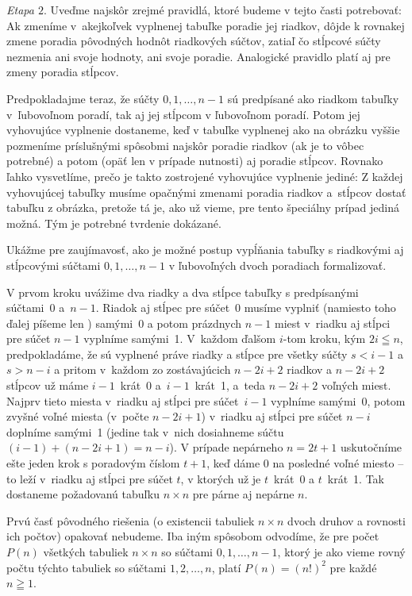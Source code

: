 {\emph{Etapa $2$}. Uveďme najskôr zrejmé pravidlá, ktoré budeme v tejto časti
potrebovať: Ak zmeníme v~akejkoľvek vyplnenej tabuľke
poradie jej riadkov,
dôjde k rovnakej zmene poradia pôvodných hodnôt riadkových súčtov,
zatiaľ čo stĺpcové súčty nezmenia ani svoje hodnoty, ani svoje
poradie. Analogické pravidlo platí aj pre zmeny poradia stĺpcov.

Predpokladajme teraz, že súčty $0,1,\dots,n-1$ sú predpísané
ako riadkom tabuľky v~ľubovoľnom poradí, tak aj jej stĺpcom
v ľubovoľnom poradí. Potom jej vyhovujúce vyplnenie dostaneme,
keď v tabuľke vyplnenej ako na obrázku vyššie pozmeníme príslušnými
spôsobmi najskôr poradie riadkov (ak je to vôbec potrebné)
a potom (opäť len v prípade nutnosti) aj poradie stĺpcov. Rovnako ľahko
vysvetlíme, prečo je takto zostrojené vyhovujúce vyplnenie jediné:
Z každej vyhovujúcej tabuľky musíme opačnými zmenami poradia riadkov a~stĺpcov
dostať tabuľku z obrázka, pretože tá je, ako už vieme,
pre tento špeciálny prípad jediná možná. Tým je potrebné tvrdenie
dokázané.

\poznamka
Ukážme pre zaujímavosť, ako je možné postup
vypĺňania tabuľky s riadkovými aj stĺpcovými súčtami
$0,1,\dots,n-1$ v ľubovoľných dvoch poradiach formalizovať.

V prvom kroku uvážime dva riadky a dva stĺpce tabuľky s predpísanými
súčtami~0 a~$n-1$. Riadok aj stĺpec pre súčet~0 musíme vyplniť
(namiesto toho ďalej píšeme len ) samými~0 a
potom prázdnych $n-1$ miest v~riadku aj stĺpci pre súčet $n-1$
vyplníme samými~1.
V~každom ďalšom $i$-tom kroku, kým $2i\leqq n$, predpokladáme,
že sú vyplnené práve riadky a stĺpce pre všetky súčty $s<i-1$ a
$s>n-i$ a pritom
v~každom zo zostávajúcich $n-2i+2$ riadkov a $n-2i+2$ stĺpcov už máme
$i-1$~krát~0 a~$i-1$~krát~1, a~teda $n-2i+2$ voľných miest.
Najprv tieto miesta v~riadku aj stĺpci pre súčet~$i-1$
vyplníme samými~0, potom zvyšné voľné miesta (v~počte $n-2i+1$)
v~riadku aj stĺpci pre súčet $n-i$ doplníme samými~1
(jedine tak v~nich dosiahneme súčtu $(i-1)+(n-2i+1)=n-i$).
V prípade nepárneho $n=2t+1$ uskutočníme ešte jeden
krok s poradovým číslom $t+1$,
keď dáme 0 na posledné voľné miesto -- to leží
v~riadku aj stĺpci pre súčet $t$, v ktorých už je
$t$~krát~0 a $t$~krát~1. Tak dostaneme
požadovanú tabuľku $n\times n$ pre párne aj nepárne $n$.


\ineriesenie
Prvú časť pôvodného riešenia (o existencii tabuliek $n\times n$
dvoch druhov a rovnosti ich počtov) opakovať nebudeme.
Iba iným spôsobom odvodíme, že pre počet $P(n)$ všetkých tabuliek
$n\times n$ so súčtami $0,1,\dots,n-1$, ktorý je ako vieme rovný
počtu týchto tabuliek so súčtami $1,2,\dots,n$, platí
$P(n)=(n!)^2$ pre každé $n\geqq1$.

}
